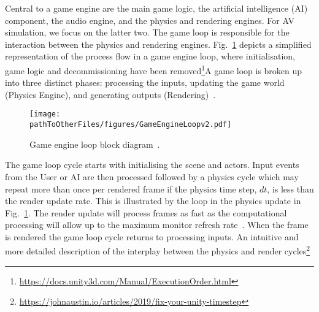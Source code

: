 Central to a game engine are the main game logic, the artificial intelligence (AI) component, the audio engine, and the physics and rendering engines. For AV simulation, we focus on the latter two. The game loop is responsible for the interaction between the physics and rendering engines. Fig.~\ref{GameEngineLoopDiagram} depicts a simplified representation of the process flow in a game engine loop, where  initialisation, game logic and decommissioning have been removed\DIFdelbegin {}\DIFdelend \DIFaddbegin \footnote{\url{https://docs.unity3d.com/Manual/ExecutionOrder.html}}\DIFaddend A game loop is broken up into three distinct phases: processing the inputs, updating the game world (Physics Engine), and generating outputs (Rendering)~\cite{GameEngineArchBook}.

\begin{figure}[h]
\centering
\texttt{[image: \\pathToOtherFiles/figures/GameEngineLoopv2.pdf]}
\caption{Game engine loop block diagram~\cite{GameProgPatternsBook}.}
\label{GameEngineLoopDiagram}
\end{figure}

The game loop cycle starts with initialising the scene and actors. Input events from the User or AI are then processed followed by a physics cycle which may repeat more than once per rendered frame if the physics time step, $dt$, is less than the render update rate. This is illustrated by the loop in the physics update in Fig.~\ref{GameEngineLoopDiagram}. The render update will process frames as fast as the computational processing will allow up to the maximum monitor refresh rate~\cite{unity_framerates}. When the frame is rendered the game loop cycle returns to processing inputs. An intuitive and  more detailed description of the interplay between the physics and render cycles\DIFdelbegin {}\DIFdelend \DIFaddbegin {}\footnote{\url{https://johnaustin.io/articles/2019/fix-your-unity-timestep}}\DIFaddend 

